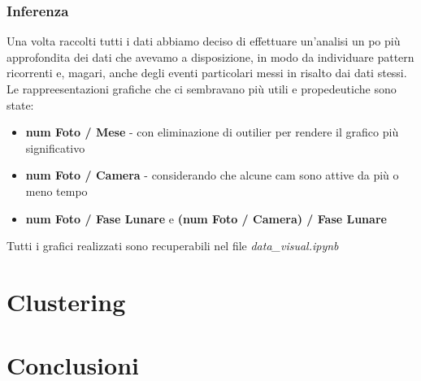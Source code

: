 \documentclass[12pt,a4paper,twoside]{article}
\begin{document}
\subsubsection{Inferenza}
Una volta raccolti tutti i dati abbiamo deciso di effettuare un'analisi un po più approfondita dei dati 
che avevamo a disposizione, in modo da individuare pattern ricorrenti e, magari, anche degli eventi 
particolari messi in risalto dai dati stessi.\\
Le rappreesentazioni grafiche che ci sembravano più utili e propedeutiche sono state: 
\begin{itemize}
    \item \textbf{num Foto / Mese} - con eliminazione di outilier per rendere il grafico più significativo
    \item \textbf{num Foto / Camera} - considerando che alcune cam sono attive da più o meno tempo
    \item \textbf{num Foto / Fase Lunare} e \textbf{(num Foto / Camera) / Fase Lunare}
\end{itemize} 
Tutti i grafici realizzati sono recuperabili nel file \textit{data\_visual.ipynb}

\section{Clustering}

\section{Conclusioni}
\end{document}
